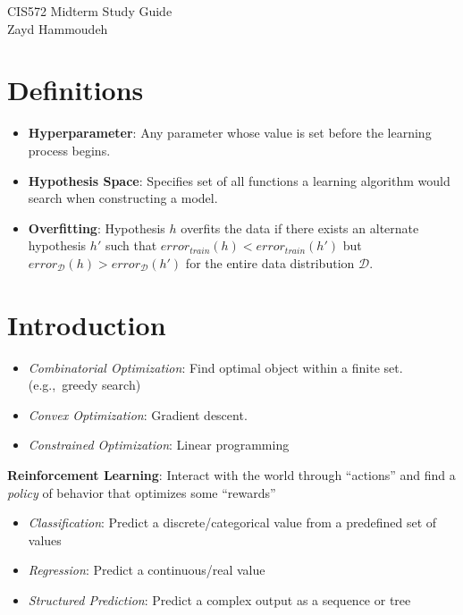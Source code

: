 \documentclass[10pt]{article}
\begin{document}
\begin{center}
  {\Large CIS572 Midterm Study Guide} \\\vspace{6pt}
  Zayd Hammoudeh
\end{center}

\begin{multicols}{3}
  \section*{Definitions}

  \begin{itemize}
    \item \textbf{Hyperparameter}: Any parameter whose value is set before the learning process begins.
    \item \textbf{Hypothesis Space}: Specifies set of all functions a learning algorithm would search when constructing a model.
    \item \textbf{Overfitting}: Hypothesis $h$ overfits the data if there exists an alternate hypothesis $h'$ such that $error_{train}(h) < error_{train}(h')$ but $error_{\mathcal{D}}(h) > error_{\mathcal{D}}(h')$ for the entire data distribution $\mathcal{D}$.
  \end{itemize}

  \section{Introduction}

  \begin{itemize}
    \item \textit{Combinatorial Optimization}: Find optimal object within a finite set. (e.g.,~greedy search)
    \item \textit{Convex Optimization}: Gradient descent.
    \item \textit{Constrained Optimization}: Linear programming
  \end{itemize}

  \textbf{Reinforcement Learning}: Interact with the world through ``actions'' and find a \textit{policy} of behavior that optimizes some ``rewards''

  \begin{itemize}
    \item \textit{Classification}: Predict a discrete/categorical value from a predefined set of values
    \item \textit{Regression}: Predict a continuous/real value
    \item \textit{Structured Prediction}: Predict a complex output as a sequence or tree
  \end{itemize}


\end{multicols}
\end{document}
